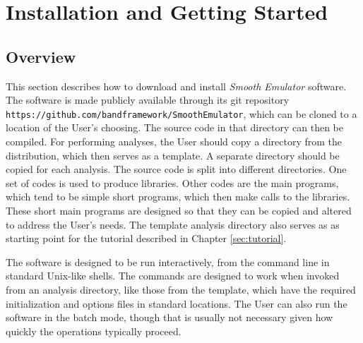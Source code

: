 \documentclass[UserManual.tex]{subfiles}
\begin{document}
\begin{sloppypar}

\section{Installation and Getting Started}\label{sec:installation}

\subsection{Overview}
This section describes how to download and install {\it Smooth Emulator} software. The software is made publicly available through its git repository {\tt https://github.com/bandframework/SmoothEmulator}, which can be cloned to a location of the User's choosing. The source code in that directory can then be compiled. For performing analyses, the User should copy a directory from the distribution, which then serves as a template. A separate directory should be copied for each analysis. The source code is split into different directories. One set of codes is used to produce libraries. Other codes are the main programs, which tend to be simple short programs, which then make calls to the libraries. These short main programs are designed so that they can be copied and altered to address the User's needs. The template analysis directory also serves as as starting point for the tutorial described in Chapter \ref{sec:tutorial}.

The software is designed to be run interactively, from the command line in standard Unix-like shells. The commands are designed to work when invoked from an analysis directory, like those from the template, which have the required initialization and options files in standard locations. The User can also run the software in the batch mode, though that is usually not necessary given how quickly the operations typically proceed.


\end{sloppypar}
\end{document}
